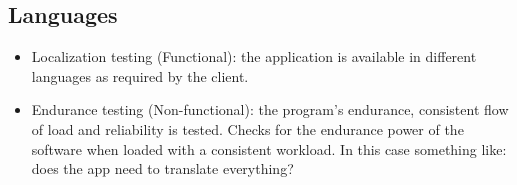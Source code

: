 \documentclass{article}
\begin{document}
\subsection{Languages}
\begin{itemize}
    \item Localization testing (Functional): the application is available in different languages as required by the client. 
    \item Endurance testing (Non-functional): the program's endurance, consistent flow of load and reliability is tested. Checks for the endurance power of the software when loaded with a consistent workload. In this case something like: does the app need to translate everything?  
\end{itemize}

\end{document}
